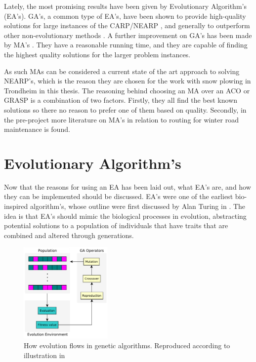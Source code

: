 Lately, the most promising results have been given by Evolutionary Algorithm's (EA's). GA's, a common type of EA's, have been shown to provide high-quality solutions for large instances of the CARP/NEARP \citep{lacomme2001GA}, and generally to outperform other non-evolutionary methods \citep{wohlk2008decade}. A further improvement on GA's has been made by MA's \citep{prins2005memeticNEARP}. They have a reasonable running time, and they are capable of finding the highest quality solutions for the larger problem instances.

As such MAs can be considered a current state of the art approach to solving NEARP's, which is the reason they are chosen for the work with snow plowing in Trondheim in this thesis. The reasoning behind choosing an MA over an ACO or GRASP is a combination of two factors. Firstly, they all find the best known solutions so there no reason to prefer one of them based on quality. Secondly, in the pre-project \citep{forprosjektet} more literature on MA's in relation to routing for winter road maintenance is found.


\section{Evolutionary Algorithm's} %
\label{sec:evolutionary_algorithms}
Now that the reasons for using an EA has been laid out, what EA's are, and how they can be implemented should be discussed. EA's were one of the earliest bio-inspired algorithm's, whose outline were first discussed by Alan Turing in \citet{turing1950computing}. The idea is that EA's should mimic the biological processes in evolution, abstracting potential solutions to a population of individuals that have traits that are combined and altered through generations.

\begin{figure}
    \begin{center}
        \includegraphics[width=0.4\textwidth]{figures/GA_general_flow_illustration.pdf}
    \end{center}
    \caption{How evolution flows in genetic algorithms. Reproduced according to illustration in \citet{gaFlowIllustrationSource}}
    \label{fig:ga_flow_illustraion}
\end{figure}

